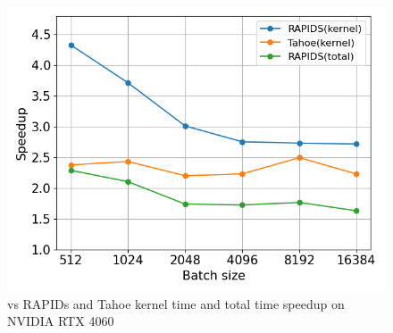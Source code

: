 
\begin{figure}[htb]
  \centering
  \includegraphics[width=0.75\linewidth]{figures/geomean_speedup_4060_kernel_time_total_time.png}
  \caption{\Treebeard{} vs RAPIDs and Tahoe kernel time and total time speedup on NVIDIA RTX 4060}
  \label{Fig:TBvsRAPIDsTahoe_4060_Speedup}
\end{figure}


